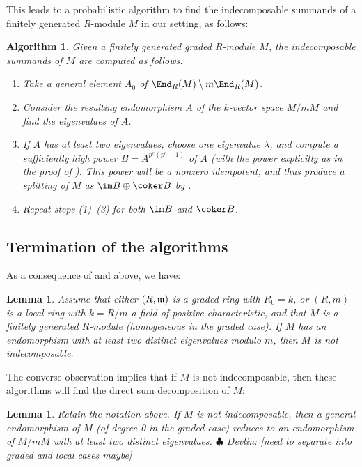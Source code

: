 \documentclass[12pt]{article}
\let\l\lambda
\theoremstyle{theorem}
\numberwithin{thm}{section}
\newtheorem{algm}[thm]{Algorithm}
\newtheorem{lem}[thm]{Lemma}
\theoremstyle{definition}
\newcommand{\devlin}[1]{{\color{red} \sf $\clubsuit$ Devlin: [#1]}}
\begin{document}
This leads to a probabilistic algorithm to find the indecomposable summands of a finitely generated $R$-module $M$ in our setting, as follows:

\begin{algm}\label{local_algorithm} 
Given a finitely generated graded $R$-module $M$, the indecomposable summands of $M$ are computed as follows.
  \begin{enumerate}
\item Take a general element $A_0$ of $\End_R(M) \setminus m \End_R(M)$.
  \item Consider the resulting endomorphism $A$ of the $k$-vector space $M/mM$ and find the eigenvalues of $A$.
  \item If $A$ has at least two eigenvalues, choose one eigenvalue $\l$, and compute a sufficiently high power $B=A^{p^e(p^{e}-1)}$ of $A$ (with the power explicitly as in the proof of ). This power will be a nonzero idempotent, and thus produce a splitting of $M$ as $\im B \oplus \coker B$ by .
  \item Repeat steps (1)--(3) for both $\im B$ and $\coker B$.
  \end{enumerate}
\end{algm}

\subsection{Termination of the algorithms}

As a consequence of  and  above, we have:

\begin{lem}
Assume that either $(R,\mathfrak m)$ is a graded ring with $R_0=k$, or $(R,m)$ is a local ring with $k=R/m$ a field of positive characteristic, and that $M$ is a finitely generated $R$-module (homogeneous in the graded case).
If $M$ has an endomorphism with at least two distinct eigenvalues modulo $m$, then $M$ is not indecomposable.
\end{lem}

The converse observation implies that if $M$ is not indecomposable, then these algorithms will find the direct sum decomposition of $M$:

\begin{lem}
\label{lemma_term}
Retain the notation above.
  If $M$ is not indecomposable, then a general endomorphism of $M$ (of degree 0 in the graded case) reduces to an endomorphism of $M/mM$ with at least two distinct eigenvalues.
\devlin{need to separate into graded and local cases maybe}
\end{lem}
\end{document}
